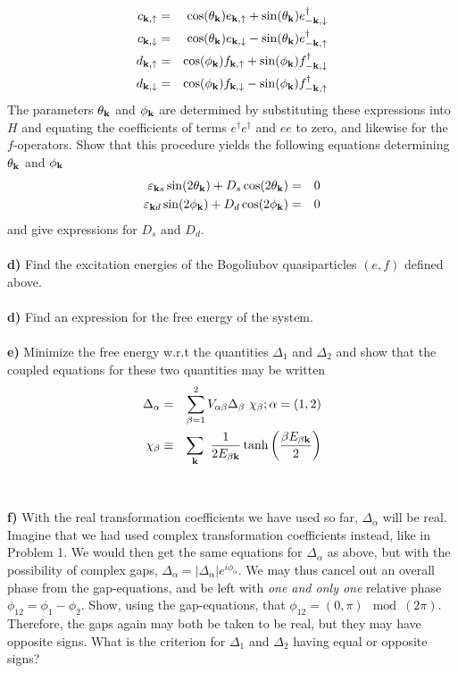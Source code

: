 \documentclass{article}
\begin{document}
\begin{eqnarray}
c_{{\bf k},\uparrow} & = & 
\cos(\theta_{\bf k}) e_{{\bf k},\uparrow} +  \sin(\theta_{\bf k}) e^{\dagger}_{-{\bf k},\downarrow}  \nonumber \\
c_{{\bf k},\downarrow} & = & 
\cos(\theta_{\bf k}) e_{{\bf k},\downarrow} - \sin(\theta_{\bf k}) e^{\dagger}_{-{\bf k},\uparrow} \nonumber \\
d_{{\bf k},\uparrow} & = & 
\cos(\phi_{\bf k}) f_{{\bf k},\uparrow} +  \sin(\phi_{\bf k}) f^{\dagger}_{-{\bf k},\downarrow}  \nonumber \\
d_{{\bf k},\downarrow} & = & 
\cos(\phi_{\bf k}) f_{{\bf k},\downarrow} - \sin(\phi_{\bf k}) f^{\dagger}_{-{\bf k},\uparrow} \nonumber 
\end{eqnarray}
The parameters $\theta_{\bf k}$ and $\phi_{\bf k}$ are determined by substituting these expressions into $H$ and equating
the coefficients of terms $e^{\dagger}e^{\dagger}  $ and $e e$ to zero, and likewise for the $f$-operators. Show that this procedure yields the following equations determining  $\theta_{\bf k}$ and $\phi_{\bf k}$
\begin{eqnarray}
\varepsilon_{{\bf k} s}  \sin(2 \theta_{\bf k}) +  D_s \cos(2 \theta_{\bf k})  & = & 0 \nonumber \\
\varepsilon_{{\bf k} d}  \sin(2 \phi_{\bf k}) +    D_d \cos(2 \phi_{\bf k})  & = & 0 \nonumber 
\end{eqnarray}
and give expressions for $D_s$ and $D_d$. 
\ \\
\ \\
{\bf d)} Find the excitation energies of the Bogoliubov quasiparticles $(e,f)$ defined above.
\ \\
\ \\
{\bf d)} Find an expression for the free energy of the system.
\ \\
\ \\
{\bf e)} Minimize the free energy w.r.t the quantities $\Delta_1$ and $\Delta_2$ and show that the coupled equations for these two quantities may be written
\begin{eqnarray}
\Delta_{\alpha} & = & \sum_{\beta=1}^2 V_{\alpha \beta} \Delta_{\beta} ~ \chi_{\beta};  \alpha = (1,2)  \nonumber \\
\chi_{\beta} & \equiv & \sum_{\bf k} ~ \frac{1}{2 E_{\beta \bf k} } \tanh \left( \frac{\beta E_{\beta \bf k}}{2} \right) \nonumber
\end{eqnarray}
\ \\
\ \\
{\bf f)} With the real transformation coefficients we have used so far, $\Delta_\alpha$ will be real. Imagine that we had used complex transformation coefficients instead, like in Problem 1. We would then get the same equations for $\Delta_{\alpha}$ as above, but  with the possibility of complex gaps, $\Delta_{\alpha} = |\Delta_{\alpha}| e^{i \phi_\alpha}$. We may thus cancel out an overall phase from the gap-equations, and be left with {\it one and only one} relative phase $\phi_{12}= \phi_1-\phi_2$. Show, using the gap-equations, that $\phi_{12} = (0,\pi) \mod(2 \pi)$. Therefore, the gaps again may both be taken to be real, but they may have opposite signs. What is the criterion for $\Delta_1$ and $\Delta_2$ having equal or opposite signs?
\end{document}

